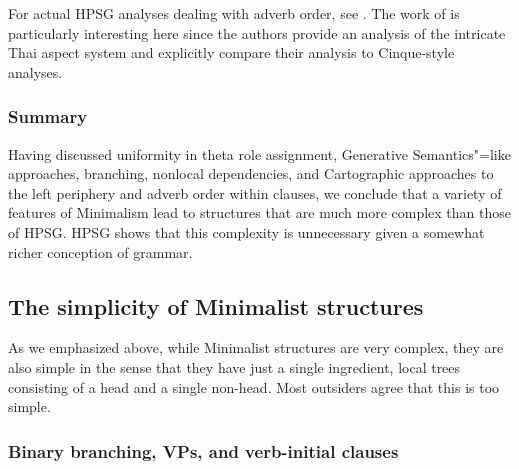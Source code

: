 \documentclass[output=paper
                ,modfonts
                ,nonflat
	        ,collection
	        ,collectionchapter
	        ,collectiontoclongg
 	        ,biblatex
                ,babelshorthands
                ,newtxmath
                ,draftmode
                ,colorlinks, citecolor=brown
]{./langsci/langscibook}
\begin{document}
For actual HPSG analyses dealing with adverb order, see .
The work of \citet{KM2005a} is particularly interesting here since the authors provide an analysis of the
intricate Thai aspect system and explicitly compare their analysis to Cinque-style analyses.


\subsubsection{Summary}

Having discussed uniformity in theta role assignment, Generative Semantics"=like approaches,
branching, nonlocal dependencies, and Cartographic approaches to the left periphery and adverb 
order within clauses,  we conclude that a variety of features of Minimalism lead to structures that
are much more complex than those of HPSG. HPSG shows that this complexity is unnecessary given a
somewhat richer conception of grammar. 

\subsection{The simplicity of Minimalist structures}
\label{subsec:min-simplicity}

As we emphasized above, while Minimalist structures are very complex, they are also simple in the
sense that they have just a single ingredient, local trees consisting of a head and a single
non-head. Most outsiders agree that this is too simple.

\subsubsection{Binary branching, VPs, and verb-initial clauses}
\end{document}
